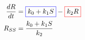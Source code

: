 \documentclass[preview]{standalone}
\begin{document}
\pagestyle{empty}
\begin{equation*}
\begin{aligned}
	\frac{dR}{dt} & = {\color{blue}\boxed{\color{black}k_0 + k_1S}} - \color{red}{\boxed{\color{black}k_2R}} \\ 
	R_{SS} & = \frac{k_0 + k_1S}{k_2}
\end{aligned}
\end{equation*}
\vfill
\end{document}
